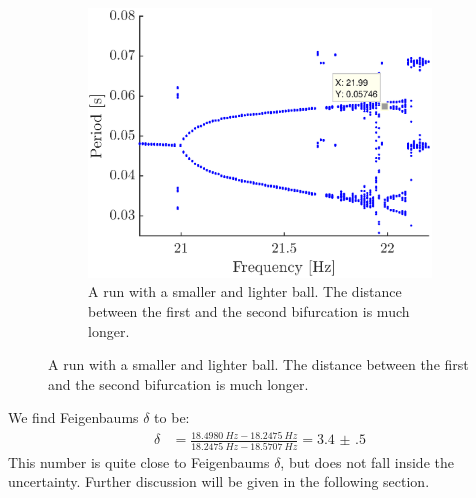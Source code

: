 \documentclass[12pt,oneside,a4paper]{article}
\numberwithin{equation}{section}
\begin{document}
{{{{\begin{figure}[h]
\begin{subfigure}[t]{0.49\textwidth}
\centering
\includegraphics[width=\textwidth]{long}
\caption{A run with a smaller and lighter ball. The distance between the first and the second bifurcation is much longer.}
\label{long}
\end{subfigure}
\end{figure}
We find Feigenbaums $\delta$ to be:
\begin{align}
\delta &= \frac{\SI{18.4980}{Hz}-\SI{18.2475}{Hz}}{\SI{18.2475}{Hz}-\SI{18.5707}{Hz}} = \num{3.4(5)}
\end{align}
This number is quite close to Feigenbaums $\delta$, but does not fall inside the uncertainty. Further discussion will be given in the following section.  

}}}}
\end{document}
